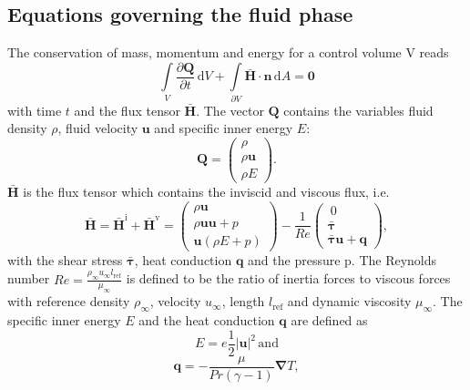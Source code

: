 \documentclass[11pt,a4paper,openany,oneside,parskip=half*]{article}
\renewcommand*\vec[1]{\boldsymbol{#1}}
\renewcommand*\matrix[1]{\boldsymbol{#1}}
\begin{document}
\subsection{Equations governing the fluid phase}
The conservation of mass, momentum and energy for a control volume V reads
\begin{equation}
  \int\limits_V \frac{\partial{\vec{Q}}}{\partial{t}} \, \mathrm{d} V+ \int\limits_{\partial{V}} \vec{\bar{H}} \cdot \vec{n} \, \mathrm{d} A = \vec0
\end{equation}
with time $t$ and the flux tensor $ \vec{\bar{H}} $.
The vector $ \vec{Q} $ contains the variables fluid density $ \rho $, 
fluid velocity $ \vec{u} $ and specific inner energy $ E $: 
\begin{equation}
 \vec{Q}= \left( \begin{array}{c}\rho\\\rho \vec{u}\\\rho E \end{array} \right).
\end{equation}
$\vec{\bar{H}} $ is the flux tensor which contains the inviscid and viscous flux, i.e.
\begin{equation} \label{NavierStokes}
\vec{\bar{H}} = \vec{\bar{H}^\mathrm{i}} + \vec{\bar{H}^\mathrm{v}} = 
 \left( \begin{array}{c}\rho \vec{u}\\\rho \vec{u} \vec{u} + p\\\vec{u} (\rho E + p) \end{array} \right) - 
 \frac{1}{Re} \left( \begin{array}{c}\ 0 \\ \matrix{\bar{\tau}}\\ \matrix{\bar{\tau}} \vec{u} + \vec{q} \end{array} \right),
\end{equation} 
with the shear stress $\matrix{\bar{\tau}}$, heat conduction $\vec{q}$ and the pressure p. The Reynolds number 
$ Re = \frac{\rho_\infty u_\infty l_\mathrm{ref}}{\mu_\infty} $ is defined to be the ratio of inertia forces to viscous forces with reference density $\rho_\infty$, velocity $u_\infty$, length $l_\mathrm{ref}$ and dynamic viscosity $\mu_\infty$. 
\newline
The specific inner energy $ E $ 
and the heat conduction $ \vec{q}$ are defined as
\begin{equation}
 E = e  \frac{1}{2} \vec{|u|}^2 \, \mathrm{and}
\end{equation}
\begin{equation}
 \vec{q} = - \frac{\mu}{Pr (\gamma - 1)} \vec\nabla T,
\end{equation}
\end{document}
